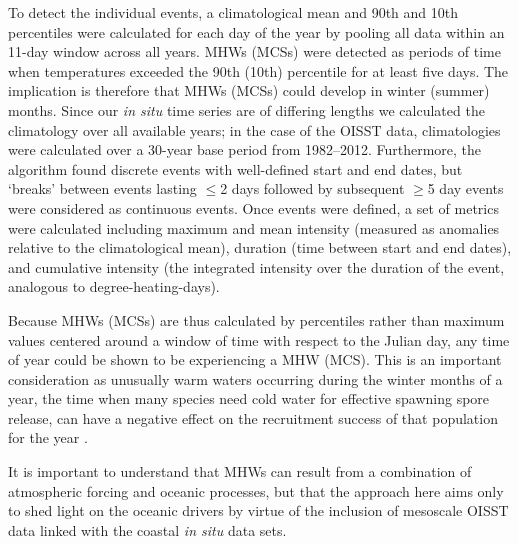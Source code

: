 \documentclass[a4paper,10pt,review]{elsarticle}
\begin{document}
To detect the individual events, a climatological mean and 90th and 10th percentiles were calculated for each day of the year by pooling all data within an 11-day window across all years. MHWs (MCSs) were detected as periods of time when temperatures exceeded the 90th (10th) percentile for at least five days. The implication is therefore that MHWs (MCSs) could develop in winter (summer) months. Since our \emph{in situ} time series are of differing lengths we calculated the climatology over all available years; in the case of the OISST data, climatologies were calculated over a 30-year base period from 1982--2012. Furthermore, the algorithm found discrete events with well-defined start and end dates, but `breaks' between events lasting $\leq$2 days followed by subsequent $\geq$5 day events were considered as continuous events. Once events were defined, a set of metrics were calculated including maximum and mean intensity (measured as anomalies relative to the climatological mean), duration (time between start and end dates), and cumulative intensity (the integrated intensity over the duration of the event, analogous to degree-heating-days).

Because MHWs (MCSs) are thus calculated by percentiles rather than maximum values centered around a window of time with respect to the Julian day, any time of year could be shown to be experiencing a MHW (MCS). This is an important consideration as unusually warm waters occurring during the winter months of a year, the time when many species need cold water for effective spawning spore release, can have a negative effect on the recruitment success of that population for the year \cite{Wernberg2011}.

It is important to understand that MHWs can result from a combination of atmospheric forcing and oceanic processes, but that the approach here aims only to shed light on the oceanic drivers by virtue of the inclusion of mesoscale OISST data linked with the coastal \emph{in situ} data sets.
\end{document}
